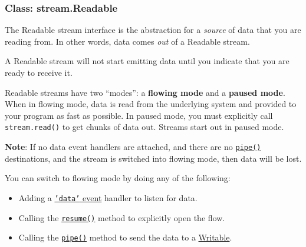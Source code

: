 \begin{Shaded}
\begin{Highlighting}[]
    \NormalTok{(} 
    \NormalTok{();}
  \NormalTok{\})}
\NormalTok{\})}

\NormalTok{(}\NormalTok{);}

\end{Highlighting}
\end{Shaded}

\subsubsection{Class: stream.Readable}

The Readable stream interface is the abstraction for a \emph{source} of
data that you are reading from. In other words, data comes \emph{out} of
a Readable stream.

A Readable stream will not start emitting data until you indicate that
you are ready to receive it.

Readable streams have two ``modes'': a \textbf{flowing mode} and a
\textbf{paused mode}. When in flowing mode, data is read from the
underlying system and provided to your program as fast as possible. In
paused mode, you must explicitly call \texttt{stream.read()} to get
chunks of data out. Streams start out in paused mode.

\textbf{Note}: If no data event handlers are attached, and there are no
\hyperref[stream\_readable\_pipe\_destination\_options]{\texttt{pipe()}}
destinations, and the stream is switched into flowing mode, then data
will be lost.

You can switch to flowing mode by doing any of the following:

\begin{itemize}
\item
  Adding a \hyperref[stream\_event\_data]{\texttt{'data'} event} handler
  to listen for data.
\item
  Calling the \hyperref[stream\_readable\_resume]{\texttt{resume()}}
  method to explicitly open the flow.
\item
  Calling the
  \hyperref[stream\_readable\_pipe\_destination\_options]{\texttt{pipe()}}
  method to send the data to a
  \hyperref[stream\_class\_stream\_writable]{Writable}.
\end{itemize}

